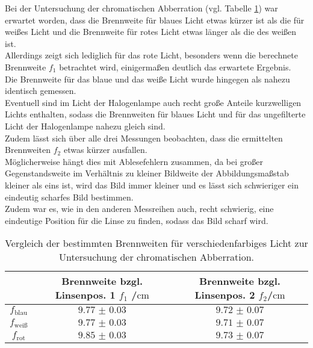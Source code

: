 Bei der Untersuchung der chromatischen Abberration (vgl. Tabelle \ref{tab:chroma}) war erwartet worden, dass die Brennweite für blaues Licht etwas kürzer ist als die für weißes Licht und die Brennweite für rotes Licht etwas länger als die des weißen ist.\\
Allerdings zeigt sich lediglich für das rote Licht, besonders wenn die berechnete Brennweite $f_\mathrm{1}$ betrachtet wird, einigermaßen deutlich das erwartete Ergebnis.
\\Die Brennweite für das blaue und das weiße Licht wurde hingegen als nahezu identisch gemessen.
\\Eventuell sind im Licht der Halogenlampe auch recht große Anteile kurzwelligen Lichts enthalten, sodass die Brennweiten für blaues Licht und für das ungefilterte Licht der Halogenlampe nahezu gleich sind.
\\ Zudem lässt sich über alle drei Messungen beobachten, dass die ermittelten Brennweiten $f_\mathrm{2}$ etwas kürzer ausfallen. \\Möglicherweise hängt dies mit Ablesefehlern zusammen, da bei großer Gegenstandsweite im Verhältnis zu kleiner Bildweite der Abbildungsmaßstab kleiner als eins ist, wird das Bild immer kleiner und es lässt sich schwieriger ein eindeutig scharfes Bild bestimmen.
\\Zudem war es, wie in den anderen Messreihen auch, recht schwierig, eine eindeutige Position für die Linse zu finden, sodass das Bild scharf wird.

\begin{table}
  \centering
  \caption{Vergleich der bestimmten Brennweiten für verschiedenfarbiges Licht zur Untersuchung der chromatischen Abberration.}
  \label{tab:chroma}
  \begin{tabular}{ccc}
    \toprule
    &Brennweite bzgl. Linsenpos. 1 $f_\mathrm{1}$ /$\si{\centi\meter}$&Brennweite bzgl. Linsenpos. 2 $f_\mathrm{2}$/$\si{\centi\meter}$\\
    \midrule
    $f_{\mathrm{blau}}$&$\num{9.77(3)}$&$\num{9.72(7)}$\\
    $f_{\mathrm{weiß}}$&$\num{9.77(3)}$&$\num{9.71(7)}$\\
    $f_{\mathrm{rot}}$&$\num{9.85(3)}$&$\num{9.73(7)}$\\
\bottomrule
\end{tabular}
\end{table}

